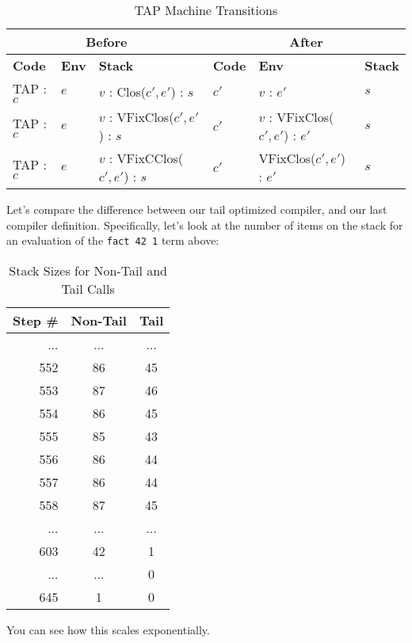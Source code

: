 \begin{table}[h]
    \centering
    \small
    \begin{tabular}{|l|l|l||l|l|l|}
        \hline
        \multicolumn{3}{|c||}{\textbf{Before}} & \multicolumn{3}{c|}{\textbf{After}} \\
        \hline
        \textbf{Code} & \textbf{Env} & \textbf{Stack} & \textbf{Code} & \textbf{Env} & \textbf{Stack} \\
        \hline
        TAP : \(c\) & \( e \) & \( v \) : Clos(\( c' , e' \)) : \( s \) & \( c' \) & \( v \) : \( e' \) & \( s \) \\
        TAP : \(c\) & \( e \) & \( v \) : VFixClos(\( c' , e' \)) : \( s \) & \( c' \) & \( v \) : VFixClos(\( c' , e' \)) : \( e' \) & \( s \) \\
        TAP : \(c\) & \( e \) & \( v \) : VFixCClos(\( c' , e' \)) : \( s \) & \( c' \) & VFixClos(\( c' , e' \)) : \( e' \) & \( s \) \\
        \hline
    \end{tabular}
    \caption{TAP Machine Transitions}
\end{table}

Let's compare the difference between our tail optimized compiler, and our last compiler definition. Specifically, let's look
at the number of items on the stack for an evaluation of the \texttt{fact 42 1} term above:

\begin{table}[h]
    \centering
    \small
    \begin{tabular}{|r||c|c|}
        \hline
        Step \# & Non-Tail & Tail \\
        \hline \hline
        ... & ... & ... \\
        \hline
        552 & 86 & 45 \\
        \hline
        553 & 87 & 46 \\
        \hline
        554 & 86 & 45 \\
        \hline
        555 & 85 & 43 \\
        \hline
        556 & 86 & 44 \\
        \hline
        557 & 86 & 44 \\
        \hline
        558 & 87 & 45 \\
        \hline
        ... & ... & ... \\
        \hline
        603 & 42 & 1 \\
        \hline
        ... & ... & 0 \\
        \hline
        645 & 1 & 0 \\
        \hline
    \end{tabular}
    \caption{Stack Sizes for Non-Tail and Tail Calls}
\end{table}

You can see how this scales exponentially.
